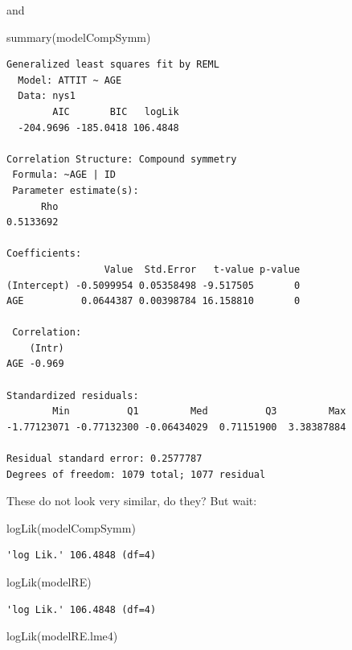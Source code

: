 \documentclass[
  letterpaper,
  DIV=11,
  numbers=noendperiod]{scrreprt}
\newenvironment{Shaded}{\begin{snugshade}}{\end{snugshade}}
\newcommand{\FunctionTok}[1]{\textcolor[rgb]{0.02,0.16,0.49}{#1}}
\newcommand{\NormalTok}[1]{\textcolor[rgb]{0.00,0.44,0.13}{#1}}
\begin{document}
and

\begin{Shaded}
\begin{Highlighting}[]
\FunctionTok{summary}\NormalTok{(modelCompSymm)}
\end{Highlighting}
\end{Shaded}

\begin{verbatim}
Generalized least squares fit by REML
  Model: ATTIT ~ AGE 
  Data: nys1 
        AIC       BIC   logLik
  -204.9696 -185.0418 106.4848

Correlation Structure: Compound symmetry
 Formula: ~AGE | ID 
 Parameter estimate(s):
      Rho 
0.5133692 

Coefficients:
                 Value  Std.Error   t-value p-value
(Intercept) -0.5099954 0.05358498 -9.517505       0
AGE          0.0644387 0.00398784 16.158810       0

 Correlation: 
    (Intr)
AGE -0.969

Standardized residuals:
        Min          Q1         Med          Q3         Max 
-1.77123071 -0.77132300 -0.06434029  0.71151900  3.38387884 

Residual standard error: 0.2577787 
Degrees of freedom: 1079 total; 1077 residual
\end{verbatim}

These do not look very similar, do they? But wait:

\begin{Shaded}
\begin{Highlighting}[]
\FunctionTok{logLik}\NormalTok{(modelCompSymm)}
\end{Highlighting}
\end{Shaded}

\begin{verbatim}
'log Lik.' 106.4848 (df=4)
\end{verbatim}

\begin{Shaded}
\begin{Highlighting}[]
\FunctionTok{logLik}\NormalTok{(modelRE)}
\end{Highlighting}
\end{Shaded}

\begin{verbatim}
'log Lik.' 106.4848 (df=4)
\end{verbatim}

\begin{Shaded}
\begin{Highlighting}[]
\FunctionTok{logLik}\NormalTok{(modelRE.lme4)}
\end{Highlighting}
\end{Shaded}
\end{document}
